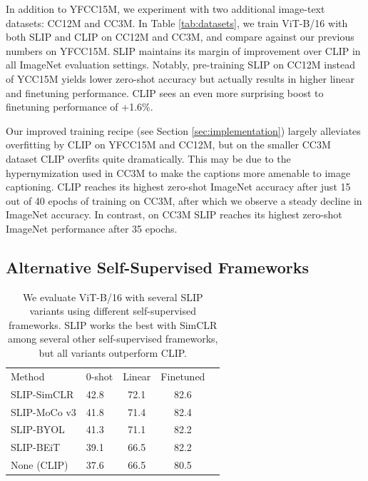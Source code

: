 \documentclass[10pt,twocolumn,letterpaper]{article}
\newcommand{\tablestyle}[2]{\setlength{\tabcolsep}{#1}\renewcommand{\arraystretch}{#2}\centering\footnotesize}
\begin{document}
In addition to YFCC15M, we experiment with two additional image-text datasets: CC12M and CC3M.
In Table \ref{tab:datasets}, we train ViT-B/16 with both SLIP and CLIP on CC12M and CC3M, and compare against our previous numbers on YFCC15M.
SLIP maintains its margin of improvement over CLIP in all ImageNet evaluation settings.
Notably, pre-training SLIP on CC12M instead of YCC15M yields lower zero-shot accuracy but actually results in higher linear and finetuning performance.
CLIP sees an even more surprising boost to finetuning performance of +1.6\%.

Our improved training recipe (see Section \ref{sec:implementation}) largely alleviates overfitting by CLIP on YFCC15M and CC12M, but on the smaller CC3M dataset CLIP overfits quite dramatically.
This may be due to the hypernymization used in CC3M to make the captions more amenable to image captioning.
CLIP reaches its highest zero-shot ImageNet accuracy after just 15 out of 40 epochs of training on CC3M, after which we observe a steady decline in ImageNet accuracy.
In contrast, on CC3M SLIP reaches its highest zero-shot ImageNet performance after 35 epochs.

\subsection{Alternative Self-Supervised Frameworks}

\begin{table}[h]
\tablestyle{2pt}{1.1}
\begin{tabular}{l l c c c}
Method & 0-shot & Linear & Finetuned \\
\shline
SLIP-SimCLR \cite{Chen2020ASF} & 42.8 & 72.1 & 82.6 \\
SLIP-MoCo v3 \cite{Chen2021AnES} & 41.8 & 71.4 & 82.4 \\
SLIP-BYOL \cite{Grill2020BootstrapYO} & 41.3 & 71.1 & 82.2 \\
SLIP-BEiT \cite{Bao2021BEiTBP} & 39.1 & 66.5 & 82.2 \\
\hline
None (CLIP) & 37.6 & 66.5 & 80.5 \\
\end{tabular}
\vspace{-.5em}
\caption{We evaluate ViT-B/16 with several SLIP variants using different self-supervised frameworks.
SLIP works the best with SimCLR among several other self-supervised frameworks, but all variants outperform CLIP.}
\label{tab:frameworks}
\vspace{-0.5em}
\end{table}
\end{document}
